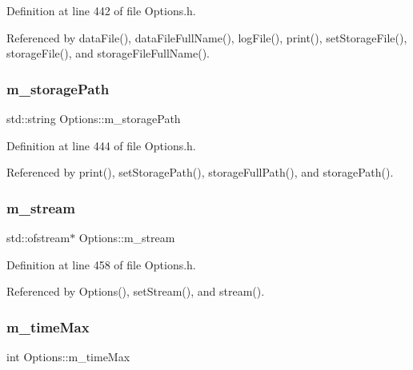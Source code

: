 Definition at line 442 of file Options.\+h.



Referenced by data\+File(), data\+File\+Full\+Name(), log\+File(), print(), set\+Storage\+File(), storage\+File(), and storage\+File\+Full\+Name().

\mbox{\label{classOptions_ad125e827cb30bc9b63875ec45b31ef5e}} 
\subsubsection{\texorpdfstring{m\+\_\+storage\+Path}{m\_storagePath}}
{\footnotesize\ttfamily std\+::string Options\+::m\+\_\+storage\+Path\hspace{0.3cm}{\ttfamily [private]}}



Definition at line 444 of file Options.\+h.



Referenced by print(), set\+Storage\+Path(), storage\+Full\+Path(), and storage\+Path().

\mbox{\label{classOptions_a8c5485cd614fa90de6b1aa85a7d2191b}} 
\subsubsection{\texorpdfstring{m\+\_\+stream}{m\_stream}}
{\footnotesize\ttfamily std\+::ofstream$\ast$ Options\+::m\+\_\+stream\hspace{0.3cm}{\ttfamily [private]}}



Definition at line 458 of file Options.\+h.



Referenced by Options(), set\+Stream(), and stream().

\mbox{\label{classOptions_a2584abb6745a082f73e2917732cd00e1}} 
\subsubsection{\texorpdfstring{m\+\_\+time\+Max}{m\_timeMax}}
{\footnotesize\ttfamily int Options\+::m\+\_\+time\+Max\hspace{0.3cm}{\ttfamily [private]}}




